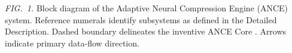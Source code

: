 \vspace{6pt}
{\small\color{midgray}
\textit{FIG.\ 1.} Block diagram of the Adaptive Neural Compression Engine (ANCE) system.
Reference numerals identify subsystems as defined in the Detailed Description.
Dashed boundary delineates the inventive ANCE Core .
Arrows indicate primary data-flow direction.}

\newpage
